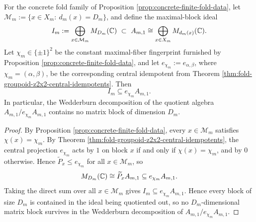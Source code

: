 \begin{proposition}\label{prop:fold-groupoid-maxblock-chi-homogeneity}

For the concrete fold family of Proposition \ref{prop:concrete-finite-fold-data}, let \(\mathcal{M}_m:=\{x\in X_m:\ d_m(x)=D_m\}\), and define the maximal-block ideal
\[
I_m:=\bigoplus_{x\in\mathcal{M}_m}M_{D_m}(\CC)\ \subset\ A_{m,1}\cong\bigoplus_{x\in X_m}M_{d_m(x)}(\CC).
\]
Let \(\chi_m\in\{\pm1\}^2\) be the constant maximal-fiber fingerprint furnished by Proposition \ref{prop:concrete-finite-fold-data}, and let \(e_{\chi_m}:=e_{\alpha,\beta}\), where \(\chi_m=(\alpha,\beta)\), be the corresponding central idempotent from Theorem \ref{thm:fold-groupoid-z2x2-central-idempotents}. Then
\[
I_m\subseteq e_{\chi_m}A_{m,1}.
\]
In particular, the Wedderburn decomposition of the quotient algebra \(A_{m,1}/e_{\chi_m}A_{m,1}\) contains no matrix block of dimension \(D_m\).
\end{proposition}
\begin{proof}
By Proposition \ref{prop:concrete-finite-fold-data}, every \(x\in\mathcal M_m\) satisfies \(\chi(x)=\chi_m\).
By Theorem \ref{thm:fold-groupoid-z2x2-central-idempotents}, the central projection \(e_{\chi_m}\) acts by \(1\) on block \(x\) if and only if \(\chi(x)=\chi_m\), and by \(0\) otherwise.
Hence \(\widetilde P_x\le e_{\chi_m}\) for all \(x\in \mathcal M_m\), so
\[
M_{D_m}(\mathbb{C})\cong \widetilde P_xA_{m,1}\subseteq e_{\chi_m}A_{m,1}.
\]
Taking the direct sum over all \(x\in\mathcal M_m\) gives \(I_m\subseteq e_{\chi_m}A_{m,1}\). Hence every block of size \(D_m\) is contained in the ideal being quotiented out, so no \(D_m\)-dimensional matrix block survives in the Wedderburn decomposition of \(A_{m,1}/e_{\chi_m}A_{m,1}\).
\end{proof}

